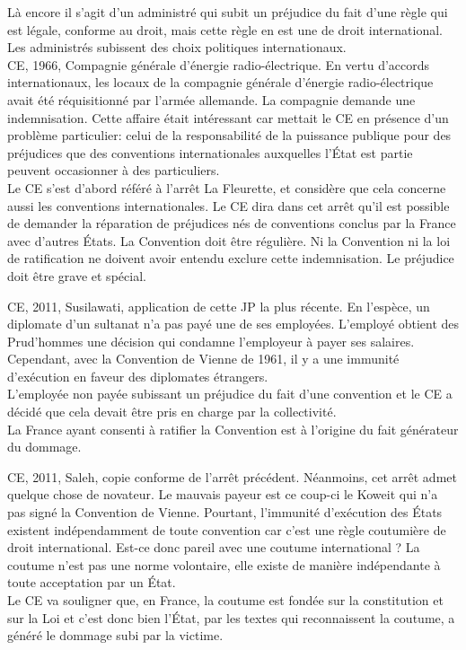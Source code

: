\documentclass[10pt, a4paper, openany]{book}
\begin{document}
Là encore il s'agit d'un administré qui subit un préjudice du fait d'une règle qui est légale, conforme au droit, mais cette règle en est une de droit international. Les administrés subissent des choix politiques internationaux. \\
CE, 1966, Compagnie générale d'énergie radio-électrique. En vertu d'accords internationaux, les locaux de la compagnie générale d'énergie radio-électrique avait été réquisitionné par l'armée allemande. La compagnie demande une indemnisation. Cette affaire était intéressant car mettait le CE en présence d'un problème particulier: celui de la responsabilité de la puissance publique pour des préjudices que des conventions internationales auxquelles l'État est partie peuvent occasionner à des particuliers. \\
Le CE s'est d'abord référé à l'arrêt La Fleurette, et considère que cela concerne aussi les conventions internationales. Le CE dira dans cet arrêt qu'il est possible de demander la réparation de préjudices nés de conventions conclus par la France avec d'autres États. La Convention doit être régulière. Ni la Convention ni la loi de ratification ne doivent avoir entendu exclure cette indemnisation. Le préjudice doit être grave et spécial. 


CE, 2011, Susilawati, application de cette JP la plus récente. En l'espèce, un diplomate d'un sultanat n'a pas payé une de ses employées. L'employé obtient des Prud'hommes une décision qui condamne l'employeur à payer ses salaires. Cependant, avec la Convention de Vienne de 1961, il y a une immunité d'exécution en faveur des diplomates étrangers. \\
L'employée non payée subissant un préjudice du fait d'une convention et le CE a décidé que cela devait être pris en charge par la collectivité. \\
La France ayant consenti à ratifier la Convention est à l'origine du fait générateur du dommage. 


CE, 2011, Saleh, copie conforme de l'arrêt précédent. Néanmoins, cet arrêt admet quelque chose de novateur. Le mauvais payeur est ce coup-ci le Koweit qui n'a pas signé la Convention de Vienne. Pourtant, l'immunité d'exécution des États existent indépendamment de toute convention car c'est une règle coutumière de droit international. Est-ce donc pareil avec une coutume international ? La coutume n'est pas une norme volontaire, elle existe de manière indépendante à toute acceptation par un État. \\
Le CE va souligner que, en France, la coutume est fondée sur la constitution et sur la Loi et c'est donc bien l'État, par les textes qui reconnaissent la coutume, a généré le dommage subi par la victime.
\end{document}

